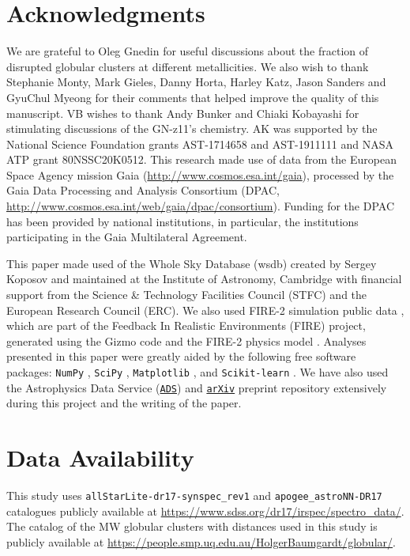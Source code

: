 \documentclass[a4paper,useAMS,usenatbib]{mnras}
\begin{document}
\section*{Acknowledgments}

We are grateful to Oleg Gnedin for useful discussions about the fraction of disrupted globular clusters at different metallicities. We also wish to thank Stephanie Monty, Mark Gieles, Danny Horta, Harley Katz, Jason Sanders and GyuChul Myeong for their comments that helped improve the quality of this manuscript. VB wishes to thank Andy Bunker and Chiaki Kobayashi for stimulating discussions of the GN-z11's chemistry. AK was supported by the National Science Foundation grants AST-1714658 and AST-1911111 and NASA ATP grant 80NSSC20K0512.
This research made use of data from the European Space Agency mission Gaia
(\url{http://www.cosmos.esa.int/gaia}), processed by the Gaia Data
Processing and Analysis Consortium (DPAC,
\url{http://www.cosmos.esa.int/web/gaia/dpac/consortium}). Funding for the
DPAC has been provided by national institutions, in particular, the
institutions participating in the Gaia Multilateral Agreement. 

This
paper made used of the Whole Sky Database (wsdb) created by Sergey
Koposov and maintained at the Institute of Astronomy, Cambridge with
financial support from the Science \& Technology Facilities Council
(STFC) and the European Research Council (ERC). We also used FIRE-2 simulation public data  \citep[][\url{http://flathub.flatironinstitute.org/fire}]{Wetzel.etal.2023}, which are part of the Feedback In Realistic Environments (FIRE) project, generated using the Gizmo code \citep{hopkins15} and the FIRE-2 physics model \citep{hopkins_etal18}. 
Analyses presented in this paper were greatly aided by the following free software packages: {\tt NumPy} \citep{NumPy}, {\tt SciPy} \citep{scipy}, {\tt Matplotlib} \citep{matplotlib}, and {\tt Scikit-learn} \citep{sklearn}. We have also used the Astrophysics Data Service (\href{http://adsabs.harvard.edu/abstract_service.html}{\tt ADS}) and \href{https://arxiv.org}{\tt arXiv} preprint repository extensively during this project and the writing of the paper.

\section*{Data Availability}

This study uses  \verb|allStarLite-dr17-synspec_rev1| and \verb|apogee_astroNN-DR17| catalogues publicly available at \url{https://www.sdss.org/dr17/irspec/spectro_data/}. The catalog of the MW globular clusters with distances used in this study is publicly available at
\url{https://people.smp.uq.edu.au/HolgerBaumgardt/globular/}. 




\appendix

\label{lastpage}
\end{document}
